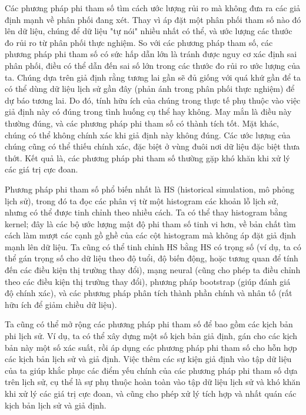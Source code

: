 Các phương pháp phi tham số tìm cách ước lượng rủi ro mà không đưa ra các giả định mạnh về phân phối đang xét. Thay vì áp đặt một phân phối tham số nào đó lên dữ liệu, chúng để dữ liệu "tự nói" nhiều nhất có thể, và ước lượng các thước đo rủi ro từ phân phối thực nghiệm. So với các phương pháp tham số, các phương pháp phi tham số có sức hấp dẫn lớn là tránh được nguy cơ xác định sai phân phối, điều có thể dẫn đến sai số lớn trong các thước đo rủi ro ước lượng của ta. Chúng dựa trên giả định rằng tương lai gần sẽ đủ giống với quá khứ gần để ta có thể dùng dữ liệu lịch sử gần đây (phản ánh trong phân phối thực nghiệm) để dự báo tương lai. Do đó, tính hữu ích của chúng trong thực tế phụ thuộc vào việc giả định này có đúng trong tình huống cụ thể hay không. May mắn là điều này thường đúng, và các phương pháp phi tham số có thành tích tốt. Mặt khác, chúng có thể không chính xác khi giả định này không đúng. Các ước lượng của chúng cũng có thể thiếu chính xác, đặc biệt ở vùng đuôi nơi dữ liệu đặc biệt thưa thớt. Kết quả là, các phương pháp phi tham số thường gặp khó khăn khi xử lý các giá trị cực đoan.

Phương pháp phi tham số phổ biến nhất là HS (historical simulation, mô phỏng lịch sử), trong đó ta đọc các phân vị từ một histogram các khoản lỗ lịch sử, nhưng có thể được tinh chỉnh theo nhiều cách. Ta có thể thay histogram bằng kernel; đây là các bộ ước lượng mật độ phi tham số tinh vi hơn, về bản chất tìm cách làm mượt các cạnh gồ ghề của các cột histogram mà không áp đặt giả định mạnh lên dữ liệu. Ta cũng có thể tinh chỉnh HS bằng HS có trọng số (ví dụ, ta có thể gán trọng số cho dữ liệu theo độ tuổi, độ biến động, hoặc tương quan để tính đến các điều kiện thị trường thay đổi), mạng neural (cũng cho phép ta điều chỉnh theo các điều kiện thị trường thay đổi), phương pháp bootstrap (giúp đánh giá độ chính xác), và các phương pháp phân tích thành phần chính và nhân tố (rất hữu ích để giảm chiều dữ liệu).

Ta cũng có thể mở rộng các phương pháp phi tham số để bao gồm các kịch bản phi lịch sử. Ví dụ, ta có thể xây dựng một số kịch bản giả định, gán cho các kịch bản này một số xác suất, rồi áp dụng các phương pháp phi tham số cho hỗn hợp các kịch bản lịch sử và giả định. Việc thêm các sự kiện giả định vào tập dữ liệu của ta giúp khắc phục các điểm yếu chính của các phương pháp phi tham số dựa trên lịch sử, cụ thể là sự phụ thuộc hoàn toàn vào tập dữ liệu lịch sử và khó khăn khi xử lý các giá trị cực đoan, và cũng cho phép xử lý tích hợp và nhất quán các kịch bản lịch sử và giả định.

